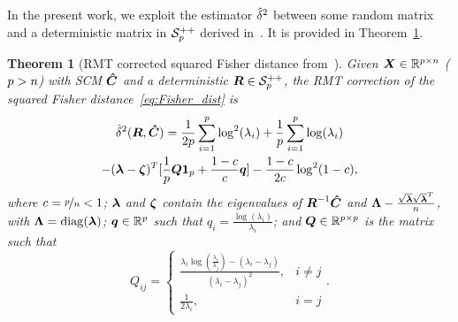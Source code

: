 \documentclass{article}
\theoremstyle{plain}
\newtheorem{theorem}{Theorem}[section]
\theoremstyle{definition}
\theoremstyle{remark}
\begin{document}
%
In the present work, we exploit the estimator $\hat{\delta}^2$ between some random matrix and a deterministic matrix in $\mathcal{S}^{++}_{p}$ derived in~\cite{couillet2019random}.
It is provided in Theorem~\ref{thm:rmt_dist}.
%
\begin{theorem}[RMT corrected squared Fisher distance from~\cite{couillet2019random}]
    Given $\boldsymbol{X}\in\mathbb{R}^{p\times n}$ ($p>n$) with SCM $\boldsymbol{\hat{C}}$ and a deterministic $\boldsymbol{R}\in\mathcal{S}^{++}_{p}$, the RMT correction of the squared Fisher distance~\eqref{eq:Fisher_dist} is
    \begin{multline}
        \hat{\delta}^2(\boldsymbol{R},\boldsymbol{\hat{C}}) = \frac1{2p}\sum_{i=1}^{p} \log^2(\lambda_i)
        + \frac1{p}\sum_{i=1}^{p} \log(\lambda_i)
        \\
        - (\boldsymbol{\lambda}-\boldsymbol{\zeta})^T[ \frac1{p}\boldsymbol{Q}\boldsymbol{1}_{p} +\frac{1-c}{c}\boldsymbol{q} ]
        - \frac{1-c}{2c}\log^2(1-c),
    \label{eq:RMT_Fisher_SCM_deterministic}
    \end{multline}
    where $c=\nicefrac{p}{n}<1$;
    $\boldsymbol{\lambda}$ and $\boldsymbol{\zeta}$ contain the eigenvalues of $\boldsymbol{R}^{-1}\boldsymbol{\hat{C}}$ and $\boldsymbol{\Lambda}-\frac{\sqrt{\boldsymbol{\lambda}}\sqrt{\boldsymbol{\lambda}}^T}{n}$, with $\boldsymbol{\Lambda}=\operatorname{diag}(\boldsymbol{\lambda})$;
    $\boldsymbol{q}\in\mathbb{R}^{p}$ such that $q_i=\frac{\log(\lambda_i)}{\lambda_i}$;
    and $\boldsymbol{Q}\in\mathbb{R}^{p\times p}$ is the matrix such that
    \begin{equation*}
        Q_{ij} = \left\{ 
        \begin{matrix}
            \frac{\lambda_i\log\left(\frac{\lambda_i}{\lambda_j}\right) - (\lambda_i-\lambda_j)}{(\lambda_i-\lambda_j)^2}, & i\neq j
            \\
            \frac1{2\lambda_i}, & i=j
        \end{matrix}
        \right. .
    \end{equation*}
\label{thm:rmt_dist}
\end{theorem}
\end{document}
